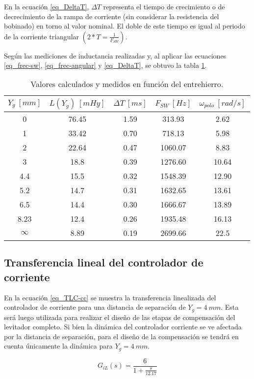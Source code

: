 \noindent En la ecuación \ref{eq_DeltaT}, $\Delta T$ representa el tiempo de crecimiento o de decrecimiento de la rampa de corriente (sin considerar la resistencia del bobinado) en torno al valor nominal. El doble de este tiempo es igual al periodo de la corriente triangular $(2*T=\frac{1}{F_{SW}})$.

\noindent Según las mediciones de inductancia realizadas y, al aplicar las ecuaciones \ref{eq_frec-sw}, \ref{eq_frec-angular} y \ref{eq_DeltaT}, se obtuvo la tabla \ref{tab_mediciones}.


\begin{table}[H]
	\begin{center}
		\begin{tabular}{| c | c | c | c | c |}
			\hline
			$Y_g\:[mm]$ & $L(Y_g)\:[mHy]$ & $\Delta T\:[ms]$ & $F_{SW}\:[Hz]$ & $\omega _{polo}\:[rad/s]$\\ \hline
			0 & 76.45 & 1.59 & 313.93 & 2.62\\ \hline
			1 & 33.42 & 0.70 & 718.13 & 5.98\\ \hline
			2 & 22.64 &	0.47 & 1060.07 & 8.83\\ \hline
			3 &	18.8 & 0.39 & 1276.60 & 10.64\\ \hline
			4.4 & 15.5 & 0.32 & 1548.39 & 12.90\\ \hline
			5.2 & 14.7 & 0.31 & 1632.65 & 13.61\\ \hline
			6.5 & 14.4 & 0.30 & 1666.67 & 13.89\\ \hline
			8.23 & 12.4 & 0.26 & 1935.48 & 16.13\\ \hline
			$\infty$ & 8.89 & 0.19 & 2699.66 & 22.5	\\ \hline
		\end{tabular}
		\caption{Valores calculados y medidos en función del entrehierro.}
		\label{tab_mediciones}
	\end{center}
\end{table}

\subsection{Transferencia lineal del controlador de corriente}

\noindent En la ecuación \ref{eq_TLC-cc} se muestra la transferencia linealizada del controlador de corriente para una distancia de separación de $Y_g=4\:mm$. Esta será luego utilizada para realizar el diseño de las etapas de compensación del levitador completo. Si bien la dinámica del controlador corriente se ve afectada por la distancia de separación, para el diseño de la compensación se tendrá en cuenta únicamente la dinámica para $Y_g=4\:mm$.

\begin{equation} \label{eq_TLC-cc}
G_{iL}(s) = \frac{6}{1+\frac{s}{12.17}}
\end{equation}
